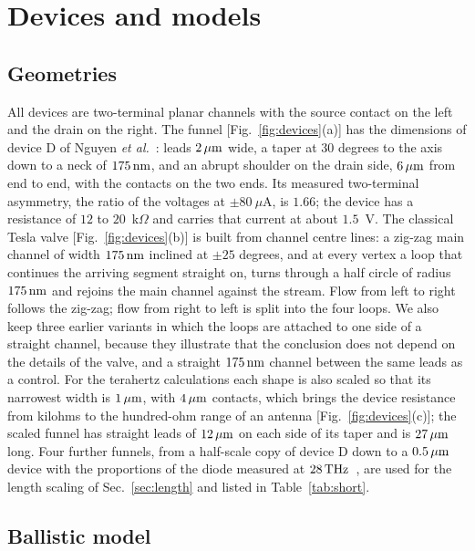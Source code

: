 \section{Devices and models}
\label{sec:models}

\subsection{Geometries}

All devices are two-terminal planar channels with the source contact on the
left and the drain on the right. The funnel [Fig.~\ref{fig:devices}(a)] has
the dimensions of device D of Nguyen \textit{et al.}~\cite{nguyen2021geometric}:
leads $2\,\mu\mathrm{m}$ wide, a taper at 30 degrees to the axis down to a neck of
$175\,\mathrm{nm}$, and an abrupt shoulder on the drain side, $6\,\mu\mathrm{m}$ from end to end,
with the contacts on the two ends. Its measured two-terminal asymmetry,
the ratio of the voltages at $\pm80\ \mu$A, is $1.66$; the device has a
resistance of $12$ to $20$~k$\Omega$ and carries that current at about
$1.5$~V. The classical Tesla valve [Fig.~\ref{fig:devices}(b)] is
built from channel centre lines: a zig-zag main channel of width $175\,\mathrm{nm}$
inclined at $\pm 25$ degrees, and at every vertex a loop that continues the
arriving segment straight on, turns through a half circle of radius $175\,\mathrm{nm}$
and rejoins the main channel against the stream. Flow from left to right
follows the zig-zag; flow from right to left is split into the four loops. We
also keep three earlier variants in which the loops are attached to one side
of a straight channel, because they illustrate that the conclusion does not
depend on the details of the valve, and a straight $175\,\mathrm{nm}$ channel between
the same leads as a control. For the terahertz calculations each shape is
also scaled so that its narrowest width is $1\,\mu\mathrm{m}$, with $4\,\mu\mathrm{m}$ contacts,
which brings the device resistance from kilohms to the hundred-ohm range of
an antenna [Fig.~\ref{fig:devices}(c)]; the scaled funnel has straight
leads of $12\,\mu\mathrm{m}$ on each side of its taper and is $27\,\mu\mathrm{m}$ long. Four further funnels, from a
half-scale copy of device D down to a $0.5\,\mu\mathrm{m}$ device with the proportions
of the diode measured at $28\,\mathrm{THz}$~\cite{zhu2013graphene}, are used for the
length scaling of Sec.~\ref{sec:length} and listed in
Table~\ref{tab:short}.

\subsection{Ballistic model}
\label{sec:model-ballistic}

